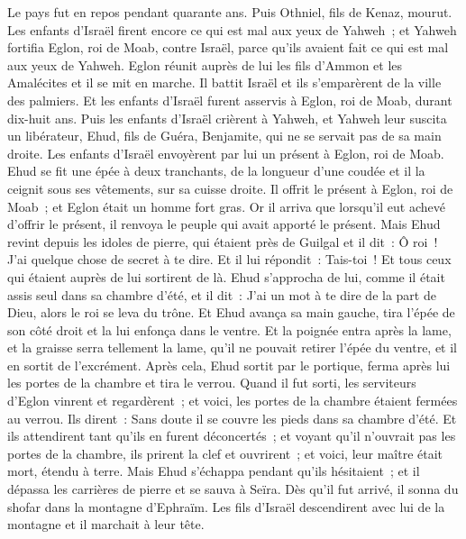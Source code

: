 \begin{multicols}{2}
Le pays fut en repos pendant quarante ans. Puis Othniel, fils de Kenaz, mourut.
Les enfants d'Israël firent encore ce qui est mal aux yeux de Yahweh~; et Yahweh fortifia Eglon, roi de Moab, contre Israël, parce qu'ils avaient fait ce qui est mal aux yeux de Yahweh.
Eglon réunit auprès de lui les fils d'Ammon et les Amalécites et il se mit en marche. Il battit Israël et ils s'emparèrent de la ville des palmiers.
Et les enfants d'Israël furent asservis à Eglon, roi de Moab, durant dix-huit ans.
Puis les enfants d'Israël crièrent à Yahweh, et Yahweh leur suscita un libérateur, Ehud, fils de Guéra, Benjamite, qui ne se servait pas de sa main droite. Les enfants d'Israël envoyèrent par lui un présent à Eglon, roi de Moab.
Ehud se fit une épée à deux tranchants, de la longueur d'une coudée et il la ceignit sous ses vêtements, sur sa cuisse droite.
Il offrit le présent à Eglon, roi de Moab~; et Eglon était un homme fort gras.
Or il arriva que lorsqu'il eut achevé d'offrir le présent, il renvoya le peuple qui avait apporté le présent.
Mais Ehud revint depuis les idoles de pierre, qui étaient près de Guilgal et il dit~: Ô roi~! J'ai quelque chose de secret à te dire. Et il lui répondit~: Tais-toi~! Et tous ceux qui étaient auprès de lui sortirent de là.
Ehud s'approcha de lui, comme il était assis seul dans sa chambre d'été, et il dit~: J'ai un mot à te dire de la part de Dieu, alors le roi se leva du trône.
Et Ehud avança sa main gauche, tira l'épée de son côté droit et la lui enfonça dans le ventre.
Et la poignée entra après la lame, et la graisse serra tellement la lame, qu'il ne pouvait retirer l'épée du ventre, et il en sortit de l'excrément.
Après cela, Ehud sortit par le portique, ferma après lui les portes de la chambre et tira le verrou.
Quand il fut sorti, les serviteurs d'Eglon vinrent et regardèrent~; et voici, les portes de la chambre étaient fermées au verrou. Ils dirent~: Sans doute il se couvre les pieds dans sa chambre d'été.
Et ils attendirent tant qu'ils en furent déconcertés~; et voyant qu'il n'ouvrait pas les portes de la chambre, ils prirent la clef et ouvrirent~; et voici, leur maître était mort, étendu à terre.
Mais Ehud s'échappa pendant qu'ils hésitaient~; et il dépassa les carrières de pierre et se sauva à Seïra.
Dès qu'il fut arrivé, il sonna du shofar dans la montagne d'Ephraïm. Les fils d'Israël descendirent avec lui de la montagne et il marchait à leur tête.

\end{multicols}
